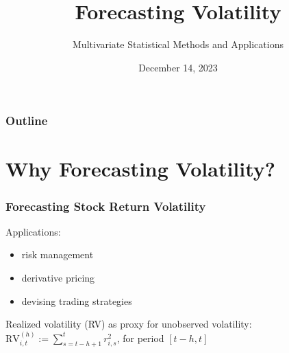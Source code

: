 \documentclass[handout]{beamer}
\title[Forecasting Volatility]{Forecasting Volatility} %
\author{Multivariate Statistical Methods and Applications} %
\institute[] %
{
\medskip
\text{Anatol Sluchych} %
}
\date{December 14, 2023} %
\begin{document}
\begin{frame}
\titlepage %
\end{frame}
\begin{frame}
\frametitle{Outline} 
\tableofcontents %
\end{frame}


\section{Why Forecasting Volatility?} %


\begin{frame}
\frametitle{Forecasting Stock Return Volatility}

Applications:
\begin{itemize}
\item risk management
\pause
\item derivative pricing
\pause
\item devising trading strategies
\end{itemize}

\vspace{15mm}
\pause

Realized volatility (RV) as proxy for unobserved volatility:
$\mathrm{RV}_{i, t}^{(h)}:=  \displaystyle\sum_{s=t-h+1}^t r_{i, s}^2 $, for period 
$[t-h, t]$

\end{frame}
\end{document}
